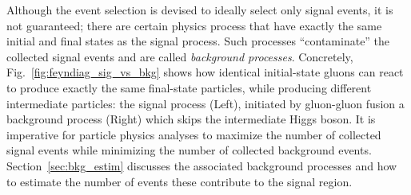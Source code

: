 Although the event selection is devised to ideally select only signal events, it is not guaranteed;
there are certain physics process that have exactly the same initial and final states as the signal process.
Such processes ``contaminate'' the collected signal events and are called \emph{background processes}.
Concretely, Fig.~\ref{fig:feyndiag_sig_vs_bkg} shows how identical initial-state gluons can react to produce exactly the same final-state particles, while producing different intermediate particles:
the signal process (Left), initiated by gluon-gluon fusion \vs a background process (Right) which skips the intermediate Higgs boson.
It is imperative for particle physics analyses to maximize the number of collected signal events while minimizing the number of collected background events.
Section~\ref{sec:bkg_estim} discusses the associated background processes and how to estimate the number of events these contribute to the signal region.




